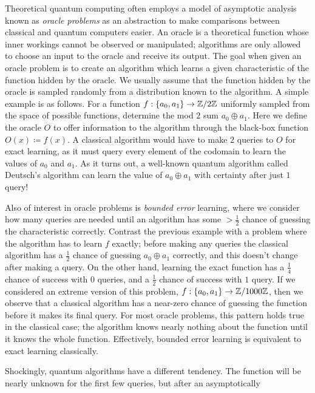 \documentclass[12pt,twoside]{reedthesis}
\theoremstyle{plain}   %
\theoremstyle{definition}
\theoremstyle{remark}
\numberwithin{equation}{section}
\begin{document}
  Theoretical quantum computing often employs a model
  of asymptotic analysis known as \emph{oracle problems} as an abstraction to make comparisons between classical and quantum computers easier.
  An oracle is a theoretical function whose inner workings cannot be observed or manipulated; algorithms are only allowed to choose an input to the oracle and receive its output.
  The goal when given an oracle problem is to create an algorithm which learns a given characteristic of the function hidden by the oracle.
  We usually assume that the function hidden by the oracle is sampled randomly from a distribution known to the algorithm.
  A simple example is as follows. For a function $f: \{a_0, a_1 \} \to \mathbb{Z} / 2\mathbb{Z}$ uniformly sampled from the space of possible functions, determine the mod $2$ sum $a_0 \oplus a_1$.
  Here we define the oracle $O$ to offer information to the algorithm through the black-box function $O(x) \coloneq f(x)$.
  A classical algorithm would have to make $2$ queries to $O$ for exact learning, as it must query every element of the codomain to learn the values of $a_0$ and $a_1$.
  As it turns out, a well-known quantum algorithm called Deutsch's algorithm can learn the value of $a_0 \oplus a_1$ with certainty after just $1$ query! \par
  Also of interest in oracle problems is \emph{bounded error} learning, where we consider how many queries are needed until an algorithm has some $> \frac{1}{2}$ chance of guessing the characteristic correctly.
  Contrast the previous example with a problem where the algorithm has to learn $f$ exactly; before making any queries the classical algorithm has a $\frac{1}{2}$ chance of guessing $a_0 \oplus a_1$ correctly,
  and this doesn't change after making a query. On the other hand, learning the exact function has a $\frac{1}{4}$ chance of success with $0$ queries, and a $\frac{1}{2}$ chance of success with $1$ query.
  If we considered an extreme version of this problem, $f: \{a_0, a_1 \} \to \mathbb{Z} / 1000\mathbb{Z}$, then we observe that a classical algorithm has a near-zero chance of guessing the function before it makes its final query.
  For most oracle problems, this pattern holds true in the classical case; the algorithm knows nearly nothing about the function until it knows the whole function.
  Effectively, bounded error learning is equivalent to exact learning classically. \par
  Shockingly, quantum algorithms have a different tendency.
  The function will be nearly unknown for the first few queries, but after an asymptotically 
\end{document}
